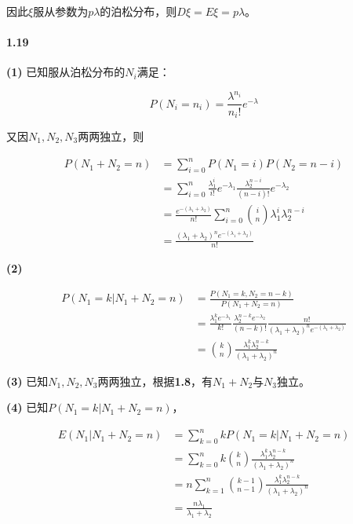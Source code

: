\documentclass{article}
\begin{document}
    因此$\xi$服从参数为$p\lambda$的泊松分布，则$D\xi = E\xi = p\lambda$。

    \paragraph*{1.19} \textbf{(1)} 已知服从泊松分布的$N_i$满足：

    \begin{equation}
        P(N_i = n_i) = \frac{\lambda^{n_i}}{n_i!}e^{-\lambda}
    \end{equation}

    又因$N_1, N_2, N_3$两两独立，则

    \begin{equation}
        \begin{aligned}
            P(N_1 + N_2 = n) &= \sum_{i=0}^n P(N_1 = i)P(N_2 = n - i) \\
            &= \sum_{i=0}^n \frac{\lambda_1^i}{i!}e^{-\lambda_1}\frac{\lambda_2^{n - i}}{(n - i)!}e^{-\lambda_2} \\
            &= \frac{e^{-(\lambda_1 +\lambda_2)}}{n!}\sum_{i=0}^n \binom{i}{n} \lambda_1^i \lambda_2^{n-i} \\
            &= \frac{(\lambda_1+\lambda_2)^n e^{-(\lambda_1 +\lambda_2)}}{n!}
        \end{aligned}
    \end{equation}

    \textbf{(2)}

    \begin{equation}
        \begin{aligned}
            P(N_1 = k | N_1 + N_2 = n) &= \frac{P(N_1 = k, N_2 = n - k)}{P(N_1 + N_2 = n)} \\
            &= \frac{\lambda_1^k e^{-\lambda_1}}{k!}\frac{\lambda_2^{n-k} e^{-\lambda_2}}{(n-k)!}\frac{n!}{(\lambda_1+\lambda_2)^{n} e^{-(\lambda_1 + \lambda_2)}} \\
            &= \binom{k}{n} \frac{\lambda_1^k\lambda_2^{n-k}}{(\lambda_1+\lambda_2)^{n}}
        \end{aligned}
    \end{equation}

    \textbf{(3)} 已知$N_1, N_2, N_3$两两独立，根据\textbf{1.8}，有$N_1 + N_2$与$N_3$独立。

    \textbf{(4)} 已知$P(N_1 = k | N_1 + N_2 = n)$，

    \begin{equation}
        \begin{aligned}
            E(N_1 | N_1 + N_2 = n) &= \sum_{k=0}^n kP(N_1 = k | N_1 + N_2 = n) \\
            &= \sum_{k=0}^n k\binom{k}{n} \frac{\lambda_1^k\lambda_2^{n-k}}{(\lambda_1+\lambda_2)^{n}} \\
            &= n\sum_{k=1}^n \binom{k-1}{n-1} \frac{\lambda_1^k\lambda_2^{n-k}}{(\lambda_1+\lambda_2)^{n}} \\
            &= \frac{n\lambda_1}{\lambda_1 + \lambda_2}
        \end{aligned}
    \end{equation}
\end{document}
